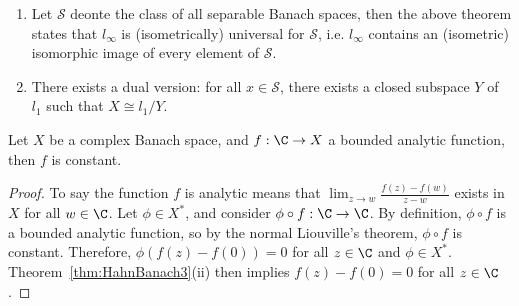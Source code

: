 \documentclass[a4paper]{article}
\begin{document}
\begin{remark}
  \begin{enumerate}[label=(\arabic*)]
    \item Let $\mathcal{S}$ deonte the class of all separable Banach spaces, then the above theorem states that $l_\infty$ is (isometrically) universal for $\mathcal{S}$, i.e. $l_\infty$ contains an (isometric) isomorphic image of every element of $\mathcal{S}$.
    \item There exists a dual version: for all $x\in\mathcal{S}$, there exists a closed subspace $Y$ of $l_1$ such that $X\cong l_1/Y$.
  \end{enumerate}
\end{remark}

\begin{nthm}\label{thm:VectorLiouville}
  Let $X$ be a complex Banach space, and $f:\C\to X$ a bounded analytic function, then $f$ is constant.
\end{nthm}

\begin{proof}
  To say the function $f$ is analytic means that $\lim_{z\to w}\frac{f(z)-f(w)}{z-w}$ exists in $X$ for all $w\in\C$. Let $\phi\in X^*$, and consider $\phi\circ f:\C\to\C$. By definition, $\phi\circ f$ is a bounded analytic function, so by the normal Liouville's theorem, $\phi\circ f$ is constant. Therefore, $\phi(f(z)-f(0))=0$ for all $z\in\C$ and $\phi\in X^*$. Theorem~\ref{thm:HahnBanach3}(ii) then implies $f(z)-f(0)=0$ for all $z\in\C$.
\end{proof}
\end{document}
